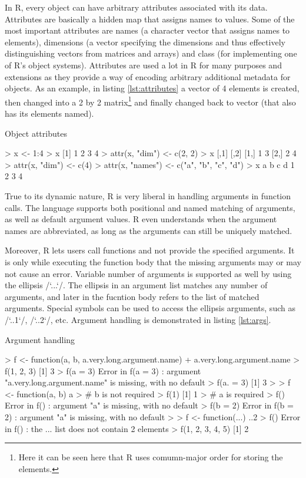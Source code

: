 {In R, every object can have arbitrary attributes associated with its data. Attributes are basically a hidden map that assigns names to values. Some of the most important attributes are names (a character vector that assigns names to elements), dimensions (a vector specifying the dimensions and thus effectively distinguishing vectors from matrices and arrays) and class (for implementing one of R's object systems). Attributes are used a lot in R for many purposes and extensions as they provide a way of encoding arbitrary additional metadata for objects. As an example, in listing \ref{lst:attributes} a vector of 4 elements is created, then changed into a 2 by 2 matrix\footnote{Here it can be seen here that R uses comumn-major order for storing the elements.} and finally changed back to vector (that also has its elements named).

\begin{listing}[htbp]
  \caption{\label{lst:attributes}Object attributes}
  \begin{rcode}
> x <- 1:4
> x
[1] 1 2 3 4
> attr(x, "dim") <- c(2, 2)
> x
     [,1] [,2]
[1,]    1    3
[2,]    2    4
> attr(x, "dim") <- c(4)
> attr(x, "names") <- c("a", "b", "c", "d")
> x
a b c d 
1 2 3 4 
  \end{rcode}
\end{listing}

True to its dynamic nature, R is very liberal in handling arguments in function calls. The language supports both positional and named matching of arguments, as well as default argument values. R even understands when the argument names are abbreviated, as long as the arguments can still be uniquely matched.

Moreover, R lets users call functions and not provide the specified arguments. It is only while executing the function body that the missing arguments may or may not cause an error. Variable number of arguments is supported as well by using the ellipsis \rinline/`...`/. The ellipsis in an argument list matches any number of arguments, and later in the fucntion body refers to the list of matched arguments. Special symbols can be used to access the ellipsis arguments, such as \rinline/`..1`/, \rinline/`..2`/, etc. Argument handling is demonstrated in listing \ref{lst:args}.

\begin{listing}[htbp]
  \caption{\label{lst:args}Argument handling}
  \begin{rcode}
> f <- function(a, b, a.very.long.argument.name)
+     a.very.long.argument.name
> f(1, 2, 3)
[1] 3
> f(a = 3)
Error in f(a = 3) : 
  argument "a.very.long.argument.name" is missing, with no default
> f(a. = 3)
[1] 3
>
> f <- function(a, b) a
> # b is not required
> f(1)
[1] 1
> # a is required
> f()
Error in f() : argument "a" is missing, with no default
> f(b = 2)
Error in f(b = 2) : argument "a" is missing, with no default
>
> f <- function(...) ..2
> f()
Error in f() : the ... list does not contain 2 elements
> f(1, 2, 3, 4, 5)
[1] 2
  \end{rcode}
\end{listing}

}
